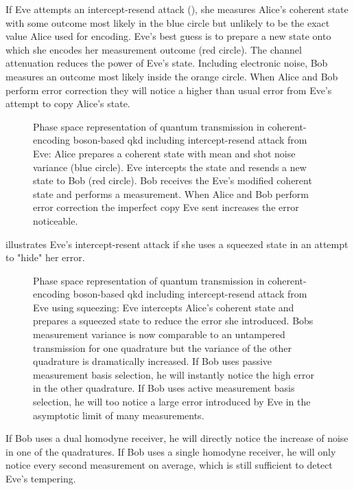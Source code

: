 If Eve attempts an intercept-resend attack (), she measures Alice's coherent state with some outcome most likely in the blue circle but unlikely to be the exact value Alice used for encoding.
Eve's best guess is to prepare a new state onto which she encodes her measurement outcome (red circle).
The channel attenuation reduces the power of Eve's state.
Including electronic noise, Bob measures an outcome most likely inside the orange circle.
When Alice and Bob perform error correction they will notice a higher than usual error from Eve's attempt to copy Alice's state.
\begin{figure}[htb]
	\centering
	
	\caption{Phase space representation of quantum transmission in coherent-encoding boson-based \gls{qkd} including intercept-resend attack from Eve: Alice prepares a coherent state with mean and shot noise variance (blue circle). Eve intercepts the state and resends a new state to Bob (red circle). Bob receives the Eve's modified coherent state and performs a measurement. When Alice and Bob perform error correction the imperfect copy Eve sent increases the error noticeable.}\label{fig:phase_space_intercept_resend}
\end{figure}
 illustrates Eve's intercept-resent attack if she uses a squeezed state in an attempt to "hide" her error.
\begin{figure}[htb]
	\centering
	
	\caption{Phase space representation of quantum transmission in coherent-encoding boson-based \gls{qkd} including intercept-resend attack from Eve using squeezing: Eve intercepts Alice's coherent state and prepares a squeezed state to reduce the error she introduced. Bobs measurement variance is now comparable to an untampered transmission for one quadrature but the variance of the other quadrature is dramatically increased. If Bob uses passive measurement basis selection, he will instantly notice the high error in the other quadrature. If Bob uses active measurement basis selection, he will too notice a large error introduced by Eve in the asymptotic limit of many measurements.}\label{fig:phase_space_intercept_resend_squeezed}
\end{figure}
If Bob uses a dual homodyne receiver, he will directly notice the increase of noise in one of the quadratures.
If Bob uses a single homodyne receiver, he will only notice every second measurement on average, which is still sufficient to detect Eve's tempering.

